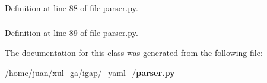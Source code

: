 \subsubsection{}\label{class__yaml___1_1parser_1_1Parser_8df2a5817a3c8b162ad2df3ae65da4a1}




Definition at line 88 of file parser.py.
\subsubsection{}\label{class__yaml___1_1parser_1_1Parser_5ae7c636c12e9208ec83dc4cccf83550}




Definition at line 89 of file parser.py.

The documentation for this class was generated from the following file:\begin{CompactItemize}
\item 
/home/juan/xul\_\-ga/igap/\_\-yaml\_\-/{\bf parser.py}\end{CompactItemize}
